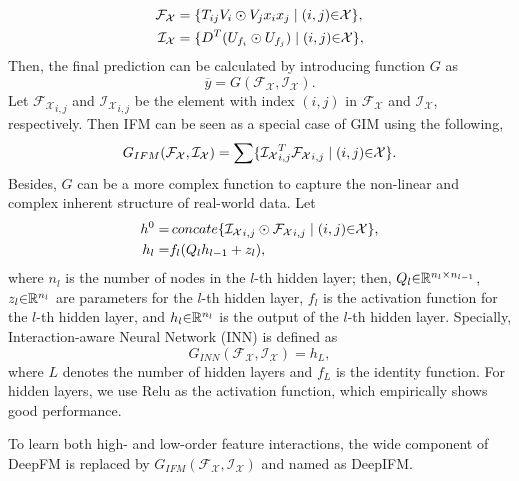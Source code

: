\documentclass[letterpaper]{article} \usepackage{aaai19}  \usepackage{times}  \usepackage{helvet}  \usepackage{courier}  \usepackage{url}  \usepackage{graphicx}  \frenchspacing  \setlength{\pdfpagewidth}{8.5in}  \setlength{\pdfpageheight}{11in}  \usepackage{mathtools}
\begin{document}
\begin{align}
\begin{split}
\mathcal{F_X} &= \{T_{ij} V_i \odot V_jx_ix_j\mid (i,j)\text{\ensuremath{\in}}\mathcal{X}\}, \\
\mathcal{I_X} &= \{D^T(U_{f_i} \odot U_{f_j})\mid (i,j)\text{\ensuremath{\in}}\mathcal{X}\},
\end{split}
\label{eq:AB}
\end{align}
Then, the final prediction can be calculated by introducing function $G$ as
\begin{equation}
\overline{y}=G(\mathcal{F_X}, \mathcal{I_X}).
\end{equation}
Let $\mathcal{F_X}_{i,j}$ and $\mathcal{I_X}_{i,j}$ be the element with index $(i,j)$ in $\mathcal{F_X}$ and $\mathcal{I_X}$, respectively. Then IFM can be seen as a special case of GIM using the following, 
\begin{equation}
G_{IFM}(\mathcal{F_X}, \mathcal{I_X}) = \sum\{\mathcal{I_X}_{i,j}^T\mathcal{F_X}_{i,j} \mid (i,j)\text{\ensuremath{\in}}\mathcal{X}\}.
\end{equation}
Besides, $G$ can be a more complex function to capture the non-linear and complex inherent structure of real-world data. Let
\begin{align}
\begin{split}
h^0=&\mathop{concate}\{\mathcal{I_X}_{i,j} \odot \mathcal{F_X}_{i,j} \mid (i,j)\text{\ensuremath{\in}}\mathcal{X}\}, \\
h_{l}=&f_l(Q_lh_{l-1}+z_l), \\
\end{split}
\end{align}
where $n_l$ is the number of nodes in the $l$-th hidden layer; then, $Q_l \text{\ensuremath{\in}}\mathbb{R}^{n_{l}\times n_{l-1}}$, $z_l \text{\ensuremath{\in}}\mathbb{R}^{n_{l}}$ are parameters for the $l$-th hidden layer, $f_l$ is the activation function for the $l$-th hidden layer, and $h_l\text{\ensuremath{\in}}\mathbb{R}^{n_l}$ is the output of the $l$-th hidden layer. Specially, Interaction-aware Neural Network (INN) is defined as
\begin{equation}
G_{INN}(\mathcal{F_X}, \mathcal{I_X}) = h_L,
\label{eq:G_INN}
\end{equation}
where $L$ denotes the number of hidden layers and $f_L$ is the identity function. For hidden layers, we use $\mathrm{Relu}$ as the activation function, which empirically shows good performance.

To learn both high- and low-order feature interactions, the wide component
of DeepFM\cite{guo2017deepfm} is replaced by $G_{IFM}(\mathcal{F_X}, \mathcal{I_X})$ and named as DeepIFM. 
\end{document}
